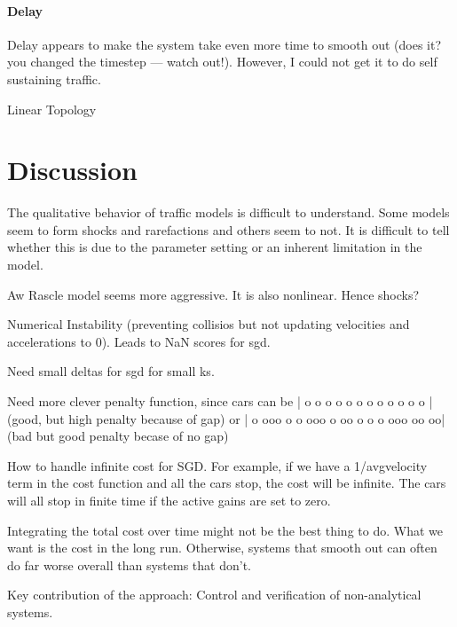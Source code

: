 \documentclass[10pt,twocolumn]{article}
\begin{document}
\paragraph{Delay}

Delay appears to make the system take even more time to smooth out (does it? you changed the timestep --- watch out!). However, I could not get it to do self sustaining traffic.



Linear Topology


\section{Discussion}  

The qualitative behavior of traffic models is difficult to understand. Some models seem to form shocks and rarefactions and others seem to not. It is difficult to tell whether this is due to the parameter setting or an inherent limitation in the model.

Aw Rascle model seems more aggressive. It is also nonlinear. Hence shocks?

Numerical Instability (preventing collisios but not updating velocities and accelerations to 0). Leads to NaN scores for sgd.

Need small deltas for sgd for small ks.

Need more clever penalty function, since cars can be | o o o o o o o o o           o o o | (good, but high penalty because of gap) or | o ooo o o ooo o oo o o o ooo oo  oo| (bad but good penalty becase of no gap)

How to handle infinite cost for SGD. For example, if we have a 1/avgvelocity term in the cost function and all the cars stop, the cost will be infinite. The cars will all stop in finite time if the active gains are set to zero.

Integrating the total cost over time might not be the best thing to do. What we want is the cost in the long run. Otherwise, systems that smooth out can often do far worse overall than systems that don't.

Key contribution of the approach: Control and verification of non-analytical systems.
\end{document}
